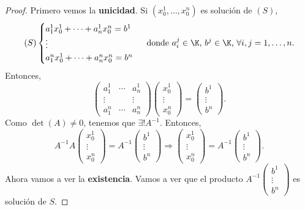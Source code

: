 \begin{proof}
Primero vemos la \textbf{unicidad}. Si $\displaystyle \left(x^{1}_{0}, \ldots, x^{n}_{0}\right) $ es solución de $\displaystyle \left(S\right) $,
\[
\left(S\right) 
\begin{cases}
a^{1}_{1}x^{1}_{0} + \cdots + a^{1}_{n}x^{n}_{0} = b^{1} \\
\vdots \\
a^{n}_{1}x^{1}_{0}+\cdots + a^{n}_{n}x^{n}_{0} = b^{n}
\end{cases}
\text{ donde $\displaystyle a^{j}_{i} \in \K $, $\displaystyle b^{j} \in \K $, $\displaystyle \forall i, j = 1, \ldots, n $.}
\]
Entonces, 
\[\begin{pmatrix} a^{1}_{1} & \cdots & a^{1}_{n} \\
\vdots & & \vdots \\
a^{n}_{1} & \cdots & a^{n}_{n}\end{pmatrix}\begin{pmatrix} x^{1}_{0} \\ \vdots \\ x^{n}_{0}\end{pmatrix} = \begin{pmatrix} b^{1} \\ \vdots \\ b^{n} \end{pmatrix} .\]
Como $\displaystyle \det\left(A\right)\neq 0 $, tenemos que $\displaystyle \exists!A^{-1} $. Entonces,
\[A^{-1}A\begin{pmatrix} x^{1}_{0} \\ \vdots \\ x^{n}_{0} \end{pmatrix} = A^{-1}\begin{pmatrix} b^{1} \\ \vdots \\ b^{n} \end{pmatrix} \Rightarrow \begin{pmatrix} x^{1}_{0} \\ \vdots \\ x^{n}_{0} \end{pmatrix} = A^{-1}\begin{pmatrix} b^{1} \\ \vdots \\ b^{n} \end{pmatrix} .\]
Ahora vamos a ver la \textbf{existencia}. Vamos a ver que el producto $\displaystyle A^{-1}\begin{pmatrix} b^{1} \\ \vdots \\ b^{n} \end{pmatrix} $ es solución de $\displaystyle S $.

\end{proof}
